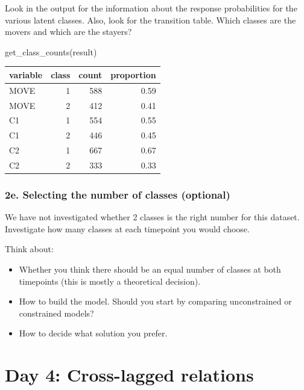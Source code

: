 \documentclass[
]{book}
\newenvironment{Shaded}{\begin{snugshade}}{\end{snugshade}}
\newcommand{\FunctionTok}[1]{\textcolor[rgb]{0.00,0.00,0.00}{#1}}
\newcommand{\NormalTok}[1]{#1}
\providecommand{\tightlist}{%
  \setlength{\itemsep}{0pt}\setlength{\parskip}{0pt}}
\begin{document}
Look in the output for the information about the response probabilities for the various latent classes. Also, look for the transition table. Which classes are the movers and which are the stayers?

\begin{Shaded}
\begin{Highlighting}[]
\FunctionTok{get\_class\_counts}\NormalTok{(result)}
\end{Highlighting}
\end{Shaded}

\begin{tabular}[t]{l|r|r|r}
\hline
variable & class & count & proportion\\
\hline
MOVE & 1 & 588 & 0.59\\
\hline
MOVE & 2 & 412 & 0.41\\
\hline
C1 & 1 & 554 & 0.55\\
\hline
C1 & 2 & 446 & 0.45\\
\hline
C2 & 1 & 667 & 0.67\\
\hline
C2 & 2 & 333 & 0.33\\
\hline
\end{tabular}

\hypertarget{e.-selecting-the-number-of-classes-optional}{%
\subsection{2e. Selecting the number of classes (optional)}\label{e.-selecting-the-number-of-classes-optional}}

We have not investigated whether 2 classes is the right number for this dataset. Investigate how many classes at each timepoint you would choose.

Think about:

\begin{itemize}
\tightlist
\item
  Whether you think there should be an equal number of classes at both timepoints (this is mostly a theoretical decision).
\item
  How to build the model. Should you start by comparing unconstrained or constrained models?
\item
  How to decide what solution you prefer.
\end{itemize}

\hypertarget{day-4-cross-lagged-relations}{%
\chapter{Day 4: Cross-lagged relations}\label{day-4-cross-lagged-relations}}
\end{document}
